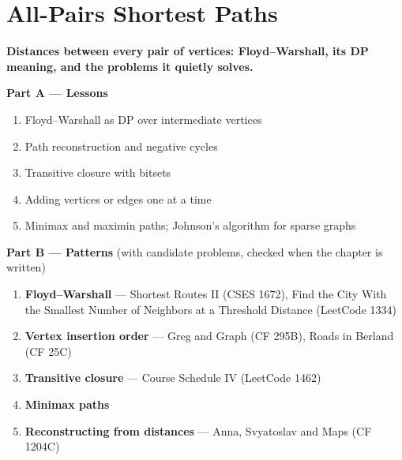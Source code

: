 \chapter{All-Pairs Shortest Paths}
\label{ch:all_pairs}

\begin{tcolorbox}[enhanced, colback=white, colframe=secondaryblue, boxrule=1pt, arc=2mm]
\textbf{\large\textcolor{primaryblue}{Distances between every pair of vertices: Floyd--Warshall, its DP meaning, and the problems it quietly solves.}}
\end{tcolorbox}


\begin{plannedbox}
\textbf{Part A --- Lessons}
\begin{enumerate}[leftmargin=*, label=\textbf{A\arabic*.}, itemsep=1pt]
    \item Floyd--Warshall as DP over intermediate vertices
    \item Path reconstruction and negative cycles
    \item Transitive closure with bitsets
    \item Adding vertices or edges one at a time
    \item Minimax and maximin paths; Johnson's algorithm for sparse graphs
\end{enumerate}
\textbf{Part B --- Patterns} (with candidate problems, checked when the chapter is written)
\begin{enumerate}[leftmargin=*, label=\textbf{P\arabic*.}, itemsep=1pt]
    \item \textbf{Floyd--Warshall} --- Shortest Routes II {\small\color{darkgray}(CSES 1672)}, Find the City With the Smallest Number of Neighbors at a Threshold Distance {\small\color{darkgray}(LeetCode 1334)}
    \item \textbf{Vertex insertion order} --- Greg and Graph {\small\color{darkgray}(CF 295B)}, Roads in Berland {\small\color{darkgray}(CF 25C)}
    \item \textbf{Transitive closure} --- Course Schedule IV {\small\color{darkgray}(LeetCode 1462)}
    \item \textbf{Minimax paths}
    \item \textbf{Reconstructing from distances} --- Anna, Svyatoslav and Maps {\small\color{darkgray}(CF 1204C)}
\end{enumerate}
\end{plannedbox}
